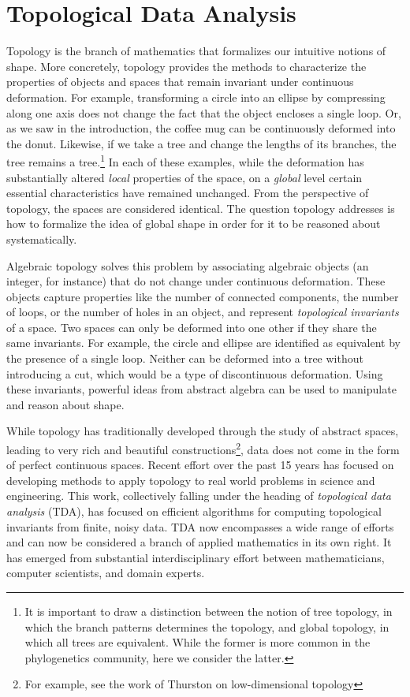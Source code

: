 \section{Topological Data Analysis}
\label{bg:tda}

Topology is the branch of mathematics that formalizes our intuitive notions of shape.
More concretely, topology provides the methods to characterize the properties of objects and spaces that remain invariant under continuous deformation.
For example, transforming a circle into an ellipse by compressing along one axis does not change the fact that the object encloses a single loop.
Or, as we saw in the introduction, the coffee mug can be continuously deformed into the donut.
Likewise, if we take a tree and change the lengths of its branches, the tree remains a tree.\footnote{It is important to draw a distinction between the notion of tree topology, in which the branch patterns determines the topology, and global topology, in which all trees are equivalent. While the former is more common in the phylogenetics community, here we consider the latter.}
In each of these examples, while the deformation has substantially altered \emph{local} properties of the space, on a \emph{global} level certain essential characteristics have remained unchanged.
From the perspective of topology, the spaces are considered identical.
The question topology addresses is how to formalize the idea of global shape in order for it to be reasoned about systematically.

Algebraic topology solves this problem by associating algebraic objects (an integer, for instance) that do not change under continuous deformation.
These objects capture properties like the number of connected components, the number of loops, or the number of holes in an object, and represent \emph{topological invariants} of a space.
Two spaces can only be deformed into one other if they share the same invariants.
For example, the circle and ellipse are identified as equivalent by the presence of a single loop.
Neither can be deformed into a tree without introducing a cut, which would be a type of discontinuous deformation.
Using these invariants, powerful ideas from abstract algebra can be used to manipulate and reason about shape.

While topology has traditionally developed through the study of abstract spaces, leading to very rich and beautiful constructions\footnote{For example, see the work of Thurston on low-dimensional topology}, data does not come in the form of perfect continuous spaces.
Recent effort over the past 15 years has focused on developing methods to apply topology to real world problems in science and engineering.
This work, collectively falling under the heading of \emph{topological data analysis} (TDA), has focused on efficient algorithms for computing topological invariants from finite, noisy data.
TDA now encompasses a wide range of efforts and can now be considered a branch of applied mathematics in its own right.
It has emerged from substantial interdisciplinary effort between mathematicians, computer scientists, and domain experts.


